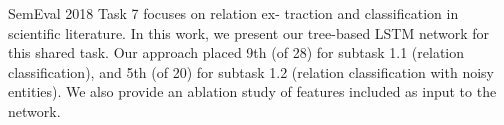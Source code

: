 SemEval 2018 Task 7 focuses on relation ex- traction and classification in scientific literature. In this work, we present our tree-based LSTM network for this shared task. Our approach placed 9th (of 28) for subtask 1.1 (relation classification), and 5th (of 20) for subtask 1.2 (relation classification with noisy entities). We also provide an ablation study of features included as input to the network.
